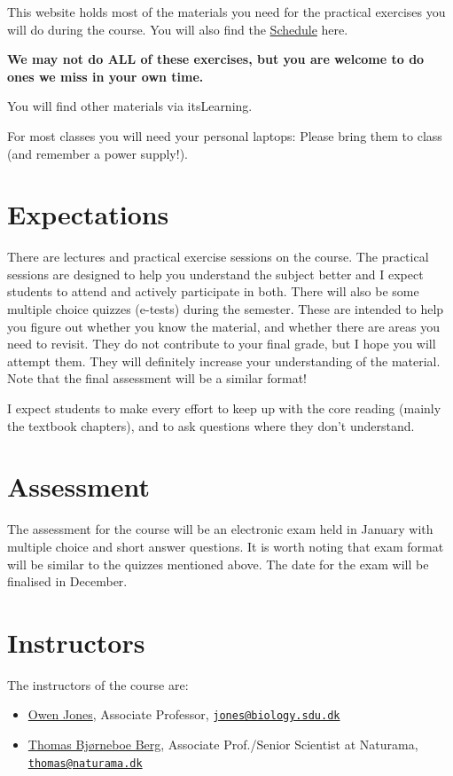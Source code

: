 \documentclass[
  a4paper]{book}
\providecommand{\tightlist}{%
  \setlength{\itemsep}{0pt}\setlength{\parskip}{0pt}}
\begin{document}
This website holds most of the materials you need for the practical exercises you will do during the course. You will also find the \href{https://jonesor.github.io/BB512_Book/schedule.html}{Schedule} here.

\textbf{We may not do ALL of these exercises, but you are welcome to do ones we miss in your own time.}

You will find other materials via itsLearning.

For most classes you will need your personal laptops: Please bring them to class (and remember a power supply!).

\section{Expectations}\label{expectations}

There are lectures and practical exercise sessions on the course. The practical sessions are designed to help you understand the subject better and I expect students to attend and actively participate in both. There will also be some multiple choice quizzes (e-tests) during the semester. These are intended to help you figure out whether you know the material, and whether there are areas you need to revisit. They do not contribute to your final grade, but I hope you will attempt them. They will definitely increase your understanding of the material. Note that the final assessment will be a similar format!

I expect students to make every effort to keep up with the core reading (mainly the textbook chapters), and to ask questions where they don't understand.

\section{Assessment}\label{assessment}

The assessment for the course will be an electronic exam held in January with multiple choice and short answer questions. It is worth noting that exam format will be similar to the quizzes mentioned above. The date for the exam will be finalised in December.

\section{Instructors}\label{instructors}

The instructors of the course are:

\begin{itemize}
\tightlist
\item
  \href{https://portal.findresearcher.sdu.dk/en/persons/jones}{Owen Jones}, Associate Professor, \href{mailto:jones@biology.sdu.dk}{\nolinkurl{jones@biology.sdu.dk}}
\item
  \href{https://portal.findresearcher.sdu.dk/en/persons/thomasbb}{Thomas Bjørneboe Berg}, Associate Prof./Senior Scientist at Naturama, \href{mailto:thomas@naturama.dk}{\nolinkurl{thomas@naturama.dk}}
\end{itemize}
\end{document}
